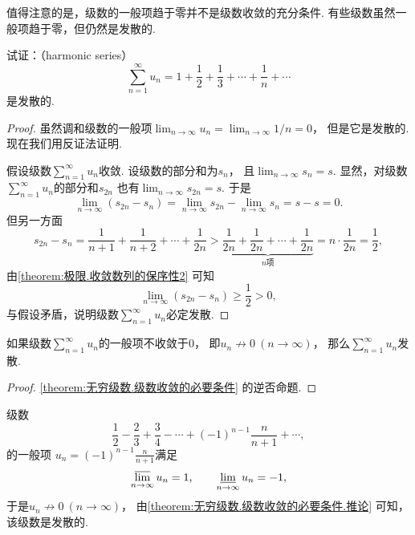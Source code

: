 值得注意的是，级数的一般项趋于零并不是级数收敛的充分条件.
有些级数虽然一般项趋于零，但仍然是发散的.
\begin{example}\label{example:无穷级数.调和级数的敛散性}
试证：（harmonic series）\[
	\sum_{n=1}^\infty u_n
	= 1+\frac12+\frac13+\dotsb+\frac1n+\dotsb
\]是发散的.
\begin{proof}
虽然调和级数的一般项\(\lim_{n\to\infty} u_n
= \lim_{n\to\infty} 1/n
= 0\)，
但是它是发散的.
现在我们用反证法证明.

假设级数\(\sum_{n=1}^\infty u_n\)收敛.
设级数的部分和为\(s_n\)，
且\(\lim_{n\to\infty} s_n
= s\).
显然，对级数\(\sum_{n=1}^\infty u_n\)的部分和\(s_{2n}\)
也有\(\lim_{n\to\infty} s_{2n}
= s\).
于是\[
	\lim_{n\to\infty} (s_{2n}-s_n)
	= \lim_{n\to\infty} s_{2n} - \lim_{n\to\infty} s_n
	= s - s
	= 0.
\]
但另一方面\[
	s_{2n} - s_n
	= \frac{1}{n+1}+\frac{1}{n+2}+\dotsb+\frac{1}{2n}
	> \underbrace{\frac{1}{2n}+\frac{1}{2n}+\dotsb+\frac{1}{2n}}_{n\text{项}}
	= n \cdot \frac1{2n}
	= \frac12,
\]
由\cref{theorem:极限.收敛数列的保序性2} 可知\[
	\lim_{n\to\infty} (s_{2n}-s_n)
	\geq \frac12
	> 0,
\]与假设矛盾，说明级数\(\sum_{n=1}^\infty u_n\)必定发散.
\end{proof}
\end{example}

\begin{corollary}\label{theorem:无穷级数.级数收敛的必要条件.推论}
如果级数\(\sum_{n=1}^\infty u_n\)的一般项不收敛于\(0\)，
即\(u_n \not\to 0\ (n\to\infty)\)，
那么\(\sum_{n=1}^\infty u_n\)发散.
\begin{proof}
\cref{theorem:无穷级数.级数收敛的必要条件} 的逆否命题.
\end{proof}
\end{corollary}

\begin{example}
级数\[
	\frac12-\frac23+\frac34-\dotsb+(-1)^{n-1}\frac{n}{n+1}+\dotsb,
\]的一般项
\(u_n = (-1)^{n-1} \frac{n}{n+1}\)满足\[
	\varlimsup_{n\to\infty} u_n = 1,
	\qquad
	\varliminf_{n\to\infty} u_n = -1,
\]
于是\(u_n \not\to 0\ (n\to\infty)\)，
由\cref{theorem:无穷级数.级数收敛的必要条件.推论} 可知，该级数是发散的.
\end{example}

